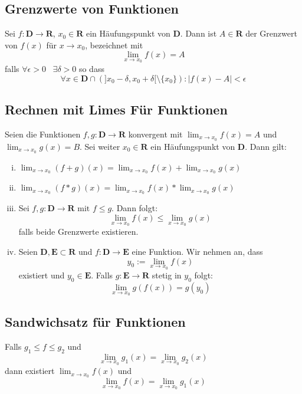 \documentclass[8pt]{article}
\begin{document}
\begin{multicols*}{3}
  \subsection {Grenzwerte von Funktionen}
Sei $f:\mathbf{D} \rightarrow \mathbf{R}$, $x_0 \in \mathbf{R}$ ein Häufungspunkt von $\mathbf{D}$.
Dann ist $A \in \mathbf{R}$ der Grenzwert von $f(x)$ für $x \rightarrow x_0$, bezeichnet mit
$$
  \lim_{x \rightarrow x_0} f(x) = A
$$
falls $\forall \epsilon > 0 \;\;\; \exists \delta > 0$ so dass
$$
  \forall x \in \mathbf{D} \cap (]x_0-\delta, x_0 + \delta[ \setminus \{x_0\}) : |f(x) - A| < \epsilon
$$
\subsection{Rechnen mit Limes Für Funktionen}
Seien die Funktionen $f, g: \mathbf{D} \rightarrow \mathbf{R}$ konvergent mit
$\lim_{x \rightarrow x_0} f(x) = A$ und $\lim_{x \rightarrow x_0} g(x) = B$. Sei weiter
$x_0 \in \mathbf{R}$ ein Häufungspunkt von $\mathbf{D}$.
Dann gilt:
\begin{enumerate}[(i)]
  \item $\lim_{x \rightarrow x_0} (f + g)(x) = \lim_{x \rightarrow x_0} f(x) + \lim_{x \rightarrow x_0} g(x)$
  \item $\lim_{x \rightarrow x_0} (f * g)(x) = \lim_{x \rightarrow x_0} f(x) * \lim_{x \rightarrow x_0} g(x)$
  \item Sei $f, g: \mathbf{D} \rightarrow \mathbf{R} \text{ mit } f \leq g$. Dann folgt:
  $$
    \lim_{x \rightarrow x_0} f(x) \leq \lim_{x \rightarrow x_0} g(x)
  $$
  falls beide Grenzwerte existieren.
  \item Seien $\mathbf{D}, \mathbf{E} \subset \mathbf{R}$ und $f: \mathbf{D} \rightarrow \mathbf{E}$ eine Funktion. Wir nehmen an, dass $$y_0 := \lim_{x \rightarrow x_0} f(x)$$ existiert
  und $y_0 \in \mathbf{E}$. Falls $g:\mathbf{E} \rightarrow \mathbf{R}$ stetig in $y_0$ folgt:
  $$\lim_{x \rightarrow x_0} g(f(x)) = g(y_0)$$
\end{enumerate}
  \subsection{Sandwichsatz für Funktionen}
Falls $g_1 \leq f \leq g_2$ und
  $$
  \lim_{x \rightarrow x_0} g_1(x) = \lim_{x \rightarrow x_0} g_2(x)
  $$
  dann existiert $\lim_{x \rightarrow x_0} f(x)$ und
  $$
  \lim_{x \rightarrow x_0} f(x) = \lim_{x \rightarrow x_0} g_1(x)
  $$

\end{multicols*}
\end{document}
